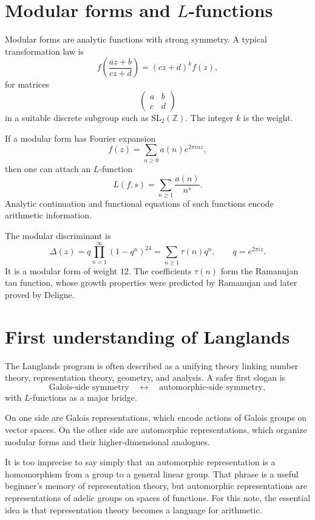 \section[Modular forms and L-functions]{Modular forms and \(L\)-functions}

Modular forms are analytic functions with strong symmetry.  A typical transformation law is
\[
  f\left(\frac{az+b}{cz+d}\right)=(cz+d)^k f(z),
\]
for matrices
\[
  \begin{pmatrix}a&b\\c&d\end{pmatrix}
\]
in a suitable discrete subgroup such as \(\mathrm{SL}_2(\mathbb Z)\).  The integer \(k\) is the weight.

If a modular form has Fourier expansion
\[
  f(z)=\sum_{n\ge0}a(n)e^{2\pi i n z},
\]
then one can attach an \(L\)-function
\[
  L(f,s)=\sum_{n\ge1}\frac{a(n)}{n^s}.
\]
Analytic continuation and functional equations of such functions encode arithmetic information.

\begin{example}
The modular discriminant is
\[
  \Delta(z)=q\prod_{n=1}^{\infty}(1-q^n)^{24}
  =\sum_{n\ge1}\tau(n)q^n,
  \qquad q=e^{2\pi iz}.
\]
It is a modular form of weight \(12\).  The coefficients \(\tau(n)\) form the Ramanujan tau function, whose growth properties were predicted by Ramanujan and later proved by Deligne.
\end{example}

\section{First understanding of Langlands}

The Langlands program is often described as a unifying theory linking number theory, representation theory, geometry, and analysis.  A safer first slogan is
\[
  \text{Galois-side symmetry}\quad\leftrightarrow\quad
  \text{automorphic-side symmetry},
\]
with \(L\)-functions as a major bridge.

On one side are Galois representations, which encode actions of Galois groups on vector spaces.  On the other side are automorphic representations, which organize modular forms and their higher-dimensional analogues.

\begin{caution}
It is too imprecise to say simply that an automorphic representation is a homomorphism from a group to a general linear group.  That phrase is a useful beginner's memory of representation theory, but automorphic representations are representations of adelic groups on spaces of functions.  For this note, the essential idea is that representation theory becomes a language for arithmetic.
\end{caution}

